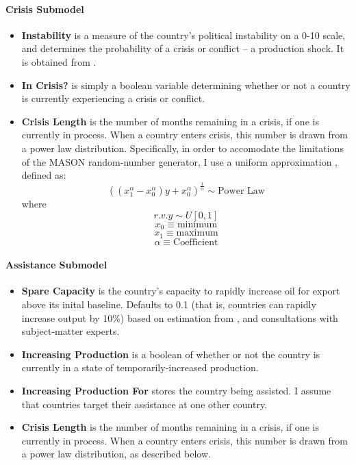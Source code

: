 \documentclass{article}
\begin{document}
\paragraph{Crisis Submodel}
\begin{itemize}
	\item \textbf{Instability} is a measure of the country's political instability on a 0-10 scale, and determines the probability of a crisis or conflict -- a production shock. It is obtained from \citet{eiu_2013}. 
	\item \textbf{In Crisis?} is simply a boolean variable determining whether or not a country is currently experiencing a crisis or conflict.
	\item \textbf{Crisis Length} is the number of months remaining in a crisis, if one is currently in process. When a country enters crisis, this number is drawn from a power law distribution. Specifically, in order to accomodate the limitations of the MASON random-number generator, I use a uniform approximation \citep{weisstein_2013}, defined as:
$$
\left((x_{1}^{\alpha} - x_{0}^{\alpha})y + x_{0}^{\alpha}\right)^{\frac{1}{\alpha}} \sim \text{Power Law}
$$
where 
$$r.v. y \sim U[0,1]$$
$$ x_0  \equiv \text{minimum}$$
$$ x_1  \equiv \text{maximum}$$
$$ \alpha \equiv \text{Coefficient}$$

\end{itemize}

\paragraph{Assistance Submodel}
\begin{itemize}
	\item \textbf{Spare Capacity} is the country's capacity to rapidly increase oil for export above its inital baseline. Defaults to 0.1 (that is, countries can rapidly increase output by 10\%) based on estimation from \citet{mearns_2012}, \citet{iea_opec} and  consultations with subject-matter experts. 
	\item \textbf{Increasing Production} is a boolean of whether or not the country is currently in a state of temporarily-increased production.
	\item \textbf{Increasing Production For} stores the country being assisted. I assume that countries target their assistance at one other country.
	\item \textbf{Crisis Length} is the number of months remaining in a crisis, if one is currently in process. When a country enters crisis, this number is drawn from a power law distribution, as described below.
	
\end{itemize}
\end{document}
